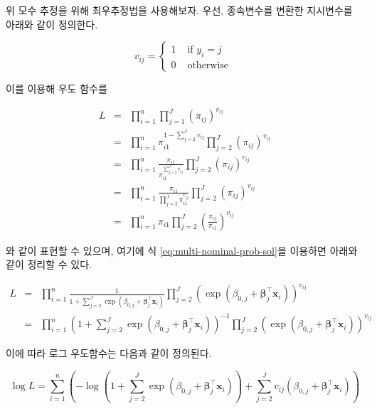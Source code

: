 \documentclass[]{book}
\begin{document}
위 모수 추정을 위해 최우추정법을 사용해보자. 우선, 종속변수를 변환한 지시변수를 아래와 같이 정의한다.

\begin{equation*}
v_{ij} = \begin{cases}
1 & \text{ if } y_i = j\\
0 & \text{ otherwise }
\end{cases}
\end{equation*}

이를 이용해 우도 함수를

\begin{eqnarray*}
L &=& \prod_{i = 1}^{n} \prod_{j = 1}^{J} \left( \pi_{ij} \right)^{v_{ij}} \\
&=& \prod_{i = 1}^{n} \pi_{i1}^{1 - \sum_{j = 2}^{J} v_{ij}} \prod_{j = 2}^{J} \left( \pi_{ij} \right)^{v_{ij}}\\
&=& \prod_{i = 1}^{n} \frac{\pi_{i1}}{\pi_{i1}^{\sum_{j = 2}^{J} v_{ij}}} \prod_{j = 2}^{J} \left( \pi_{ij} \right)^{v_{ij}}\\
&=& \prod_{i = 1}^{n} \frac{\pi_{i1}}{\prod_{j = 2}^{J} \pi_{i1}^{v_{ij}}} \prod_{j = 2}^{J} \left( \pi_{ij} \right)^{v_{ij}}\\
&=& \prod_{i = 1}^{n} \pi_{i1} \prod_{j = 2}^{J} \left( \frac{\pi_{ij}}{\pi_{i1}} \right)^{v_{ij}}
\end{eqnarray*}

와 같이 표현할 수 있으며, 여기에 식 \eqref{eq:multi-nominal-prob-sol}을 이용하면 아래와 같이 정리할 수 있다.

\begin{eqnarray*}
L &=& \prod_{i = 1}^{n} \frac{1}{1 + \sum_{j = 2}^{J} \exp \left( \beta_{0,j} + \boldsymbol\beta_{j}^\top \mathbf{x}_i \right)} \prod_{j = 2}^{J} \left( \exp \left( \beta_{0,j} + \boldsymbol\beta_{j}^\top \mathbf{x}_i \right) \right)^{v_{ij}}\\
&=& \prod_{i = 1}^{n} \left( 1 + \sum_{j = 2}^{J} \exp \left( \beta_{0,j} + \boldsymbol\beta_{j}^\top \mathbf{x}_i \right) \right)^{-1} \prod_{j = 2}^{J} \left( \exp \left( \beta_{0,j} + \boldsymbol\beta_{j}^\top \mathbf{x}_i \right) \right)^{v_{ij}}
\end{eqnarray*}

이에 따라 로그 우도함수는 다음과 같이 정의된다.

\begin{equation}
\log L = \sum_{i = 1}^{n} \left( - \log \left( 1 + \sum_{j = 2}^{J} \exp \left( \beta_{0,j} + \boldsymbol\beta_{j}^\top \mathbf{x}_i \right) \right) + \sum_{j = 2}^{J} v_{ij} \left( \beta_{0,j} + \boldsymbol\beta_{j}^\top \mathbf{x}_i \right) \right) 
\label{eq:multi-nominal-logit-loglik}
\end{equation}
\end{document}
